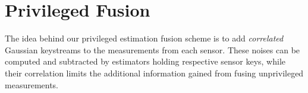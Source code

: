 \documentclass[conference]{IEEEtran}
\begin{document}
\section{Privileged Fusion}\label{sec:scheme}
The idea behind our privileged estimation fusion scheme is to add \textit{correlated} Gaussian keystreams to the measurements from each sensor. These noises can be computed and subtracted by estimators holding respective sensor keys, while their correlation limits the additional information gained from fusing unprivileged measurements. 

% 
% 
\end{document}
